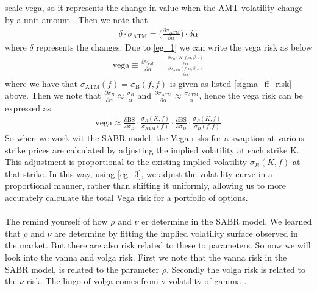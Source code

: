 scale vega, so it represents the change in value when the AMT volatility change by a unit amount \cite{Smile}.
Then we note that 
\begin{align}
    \delta  \cdot \sigma_{\text{ATM}} =
     \Big(\frac{\partial \sigma_{\text{ATM}}}{\partial \alpha} \Big) \cdot \delta \alpha \label{eg_1}
\end{align}
where $\delta$ represents the changes. Due to \autoref{eg_1} we can write the vega risk as below
\begin{align}
    \text{vega} \equiv  \frac{\partial V_{\text{call}}}{\partial \alpha} 
   = \frac{\frac{\partial \sigma_B(K, f; \alpha, \beta, \nu)}{\partial \alpha}}
    {\frac{\partial \sigma_{\text{ATM}}(f; \alpha, \beta, \nu)}{\partial \alpha}} \label{eg_3}
\end{align}
 where we have that $\sigma_{\text{ATM}}(f) = \sigma_{\text{B}} (f,f)$  is given as listed \autoref{sigma_ff_risk}
 above. 
Then we note that  $\frac{\partial \sigma_B}{\partial \alpha} \approx \frac{ \sigma_B}{ \alpha}$ 
and $\frac{\partial \sigma_{\text{ATM}}}{\partial \alpha} \approx \frac{ \sigma_{\text{ATM}}}{\alpha}$,
hence the vega risk can be expressed as 
\begin{align}
\text{vega} \approx \frac{\partial \text{BS}}{\partial \sigma_B} \cdot
 \frac{\sigma_B(K,f)}{\sigma_{\text{ATM}}(f)} \cdot \frac{\partial \text{BS}}{\partial \sigma_B} 
 \cdot \frac{\sigma_B(K,f)}{\sigma_B(f,f)}
\end{align}
So when we work wit the SABR model,
the Vega risks for a swaption at various strike prices are calculated by adjusting the implied volatility at each strike 
K. This adjustment is proportional to the existing implied volatility 
$\sigma_B(K,f)$
at that strike. In this way, using \autoref{eg_3}, we adjust the
volatility curve in a proportional manner, rather than shifting 
it uniformly, allowing us to more accurately calculate the total
Vega risk for a portfolio of options.
\\\\
The remind yourself of how $\rho$ and $\nu$ er determine in the SABR model.
We learned that $\rho$ and $\nu$ are determine by fitting the implied volatility
surface observed in the market. But there are also risk related to these 
to parameters. So now we will look into the vanna and volga risk. 
First we note that the vanna risk in the SABR model, is related 
to the  parameter $\rho$. Secondly the volga risk is related
to the $\nu$ risk. The lingo of volga comes from v volatility of gamma
\cite{Smile}.
\\\\
